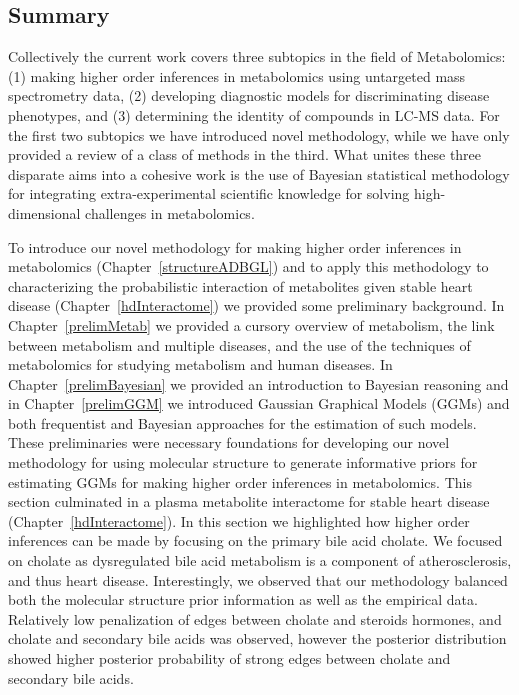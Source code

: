 \begin{DoubleSpace*}
\section{Summary}
Collectively the current work covers three subtopics in the field of Metabolomics: (1) making higher order inferences in metabolomics using untargeted mass spectrometry data, (2) developing diagnostic models for discriminating disease phenotypes, and (3) determining the identity of compounds in LC-MS data. For the first two subtopics we have introduced novel methodology, while we have only provided a review of a class of methods in the third. What unites these three disparate aims into a cohesive work is the use of Bayesian statistical methodology for integrating extra-experimental scientific knowledge for solving high-dimensional challenges in metabolomics.

To introduce our novel methodology for making higher order inferences in metabolomics (Chapter~\ref{structureADBGL}) and to apply this methodology to characterizing the probabilistic interaction of metabolites given stable heart disease (Chapter~\ref{hdInteractome}) we provided some preliminary background. In Chapter~\ref{prelimMetab} we provided a cursory overview of metabolism, the link between metabolism and multiple diseases, and the use of the techniques of metabolomics for studying metabolism and human diseases. In Chapter~\ref{prelimBayesian} we provided an introduction to Bayesian reasoning and in Chapter~\ref{prelimGGM} we introduced Gaussian Graphical Models (GGMs) and both frequentist and Bayesian approaches for the estimation of such models. These preliminaries were necessary foundations for developing our novel methodology for using molecular structure to generate informative priors for estimating GGMs for making higher order inferences in metabolomics. This section culminated in a plasma metabolite interactome for stable heart disease (Chapter~\ref{hdInteractome}). In this section we highlighted how higher order inferences can be made by focusing on the primary bile acid cholate. We focused on cholate as dysregulated bile acid metabolism is a component of atherosclerosis, and thus heart disease. Interestingly, we observed that our methodology balanced both the molecular structure prior information as well as the empirical data. Relatively low penalization of edges between cholate and steroids hormones, and cholate and secondary bile acids was observed, however the posterior distribution showed higher posterior probability of strong edges between cholate and secondary bile acids.


\end{DoubleSpace*}
